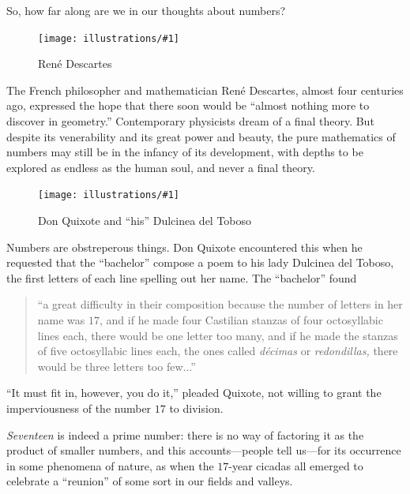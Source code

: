 \documentclass[11pt]{article}
\newcommand{\ill}[3]{ 
   \begin{figure}[H]
   \begin{center}
   \texttt{[image: illustrations/\#1]}
   \caption{#3}
   \end{center}
    \end{figure}
}
\theoremstyle{plain}
\theoremstyle{definition}
\numberwithin{equation}{section}
\numberwithin{figure}{section}
\numberwithin{table}{section}
\begin{document}
So, how far along are we in our thoughts about numbers?


\ill{descartes}{.3}{Ren\'e Descartes}

The French philosopher and mathematician Ren\'e Descartes, almost four
centuries ago, expressed the hope that there soon would be ``almost
nothing more to discover in geometry.'' Contemporary physicists dream
of a final theory.  But despite its
venerability and its great power and beauty, the pure mathematics of
numbers may still be in the infancy of its development, with depths to
be explored as endless as the human soul, and never a final theory.





\ill{dulcinea1.jpg}{.2}{Don Quixote and ``his'' Dulcinea del Toboso}

Numbers are obstreperous things. Don Quixote encountered this when he
requested that the ``bachelor'' compose a poem to his lady Dulcinea del
Toboso, the first letters of each line spelling out her name. The
``bachelor'' found

\bigskip


\begin{quote}
  ``a great difficulty in their composition because the number of
  letters in her name was $17$, and if he made four Castilian stanzas
  of four octosyllabic lines each, there would be one letter too many,
  and if he made the stanzas of five octosyllabic lines each, the ones
  called {\em d{\'e}cimas} or {\em redondillas,} there would be three
  letters too few...''
\end{quote}
  
``It must fit in, however, you do it,'' pleaded Quixote, not willing to
grant the imperviousness of the number $17$ to division.


\bigskip


{\em Seventeen} is indeed a prime number: there is no way of factoring
it as the product of smaller numbers, and this accounts---people tell
us---for its occurrence in some phenomena of nature, as when
the $17$-year cicadas all emerged to celebrate a ``reunion'' of some
sort in our fields and valleys.
\end{document}
